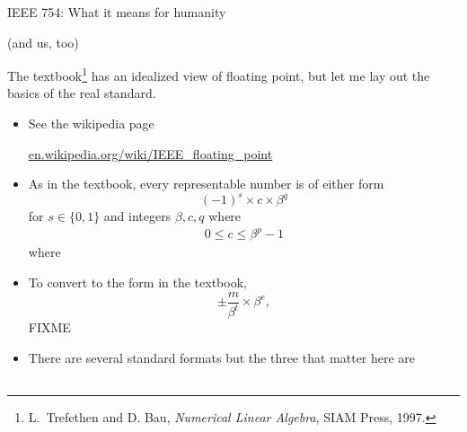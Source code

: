 \documentclass{amsart}
\begin{document}
\huge
\centerline{IEEE 754: What it means for humanity}

\Large
\centerline{(and us, too)}

\thispagestyle{empty}

\bigskip\bigskip\bigskip\bigskip\bigskip
\Large

The textbook\footnote{L.~Trefethen and D. Bau, \emph{Numerical Linear Algebra}, SIAM Press, 1997.} has an idealized view of floating point, but let me lay out the basics of the real standard.


\begin{itemize}
\setlength\itemsep{1em}
\item See the wikipedia page

 \centerline{\url{en.wikipedia.org/wiki/IEEE_floating_point}}

\item As in the textbook, every representable number is of either form
    $$(-1)^s \times c \times \beta^q$$
for $s\in\{0,1\}$ and integers $\beta,c,q$ where
\begin{gather*}
0 \le c \le \beta^p-1
\end{gather*}
where

\item To convert to the form in the textbook,
    $$\pm \frac{m}{\beta^t} \times \beta^e,$$
FIXME

\item There are several standard formats but the three that matter here are

\begin{tabular}{lllllllll}

\end{tabular}

\begin{comment}
<tr>
<th>Name</th>
<th>Common name</th>
<th>Base</th>
<th>Digits</th>
<th>Decimal<br />
digits</th>
<th>Exponent<br />
bits</th>
<th>Decimal<br />
E max</th>
<th>Exponent<br />
bias<sup id="cite_ref-DAE_4-0" class="reference"><a href="#cite_note-DAE-4"><span>[</span>4<span>]</span></a></sup></th>
<th>E min</th>
<th>E max</th>
</tr>

<tr>
<td><a href="/wiki/Single_precision_floating-point_format" title="Single precision floating-point format" class="mw-redirect">binary32</a></td>
<td>Single precision</td>
<td align="right">2</td>
<td align="right">24</td>
<td align="right">7.22</td>
<td align="right">8</td>
<td align="right">38.23</td>
<td>2<sup>7</sup>−1=127</td>
<td align="right">−126</td>
<td align="right">+127</td>
</tr>


\end{comment}
\end{itemize}
\end{document}
